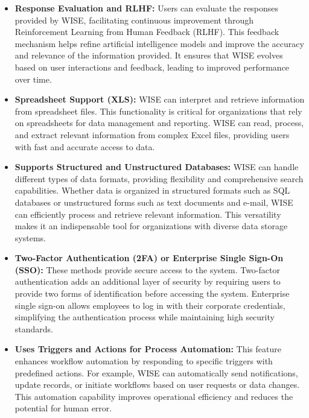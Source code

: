 \begin{itemize}
    \item \textbf{Response Evaluation and RLHF:} Users can evaluate the responses provided by WISE, facilitating continuous improvement through Reinforcement Learning from Human Feedback (RLHF). This feedback mechanism helps refine artificial intelligence models and improve the accuracy and relevance of the information provided. It ensures that WISE evolves based on user interactions and feedback, leading to improved performance over time.

    \item \textbf{Spreadsheet Support (XLS):} WISE can interpret and retrieve information from spreadsheet files. This functionality is critical for organizations that rely on spreadsheets for data management and reporting. WISE can read, process, and extract relevant information from complex Excel files, providing users with fast and accurate access to data.

    \item \textbf{Supports Structured and Unstructured Databases:} WISE can handle different types of data formats, providing flexibility and comprehensive search capabilities. Whether data is organized in structured formats such as SQL databases or unstructured forms such as text documents and e-mail, WISE can efficiently process and retrieve relevant information. This versatility makes it an indispensable tool for organizations with diverse data storage systems.

    \item \textbf{Two-Factor Authentication (2FA) or Enterprise Single Sign-On (SSO):} These methods provide secure access to the system. Two-factor authentication adds an additional layer of security by requiring users to provide two forms of identification before accessing the system. Enterprise single sign-on allows employees to log in with their corporate credentials, simplifying the authentication process while maintaining high security standards.

    \item \textbf{Uses Triggers and Actions for Process Automation:} This feature enhances workflow automation by responding to specific triggers with predefined actions. For example, WISE can automatically send notifications, update records, or initiate workflows based on user requests or data changes. This automation capability improves operational efficiency and reduces the potential for human error.

\end{itemize}

